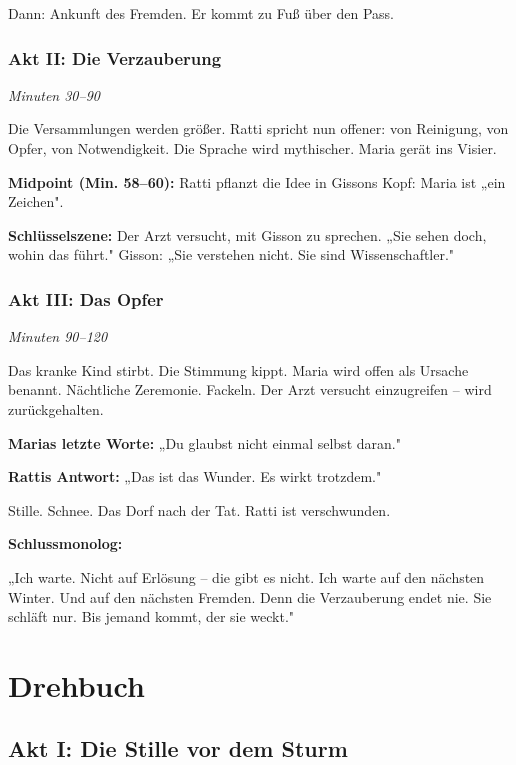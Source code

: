 \documentclass[11pt,a4paper,twoside]{book}
\begin{document}
Dann: Ankunft des Fremden. Er kommt zu Fuß über den Pass.

\section{Akt II: Die Verzauberung}
\textit{Minuten 30--90}

Die Versammlungen werden größer. Ratti spricht nun offener: von Reinigung, von Opfer, von Notwendigkeit. Die Sprache wird mythischer. Maria gerät ins Visier.

\textbf{Midpoint (Min. 58--60):} Ratti pflanzt die Idee in Gissons Kopf: Maria ist „ein Zeichen".

\textbf{Schlüsselszene:} Der Arzt versucht, mit Gisson zu sprechen. „Sie sehen doch, wohin das führt." Gisson: „Sie verstehen nicht. Sie sind Wissenschaftler."

\section{Akt III: Das Opfer}
\textit{Minuten 90--120}

Das kranke Kind stirbt. Die Stimmung kippt. Maria wird offen als Ursache benannt. Nächtliche Zeremonie. Fackeln. Der Arzt versucht einzugreifen -- wird zurückgehalten.

\textbf{Marias letzte Worte:} „Du glaubst nicht einmal selbst daran."

\textbf{Rattis Antwort:} „Das ist das Wunder. Es wirkt trotzdem."

Stille. Schnee. Das Dorf nach der Tat. Ratti ist verschwunden.

\textbf{Schlussmonolog:}
\begin{voiceoverbox}
„Ich warte. Nicht auf Erlösung -- die gibt es nicht. Ich warte auf den nächsten Winter. Und auf den nächsten Fremden. Denn die Verzauberung endet nie. Sie schläft nur. Bis jemand kommt, der sie weckt."
\end{voiceoverbox}


\part{Drehbuch}

\chapter{Akt I: Die Stille vor dem Sturm}
\end{document}
